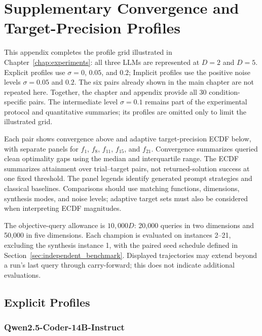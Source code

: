 \chapter{Supplementary Convergence and Target-Precision Profiles}
\label{app:benchmark_profiles}

This appendix completes the profile grid illustrated in
Chapter~\ref{chap:experiments}: all three LLMs are represented at
$D=2$ and $D=5$. Explicit profiles use $\sigma=0$, $0.05$, and $0.2$;
Implicit profiles use the positive noise levels $\sigma=0.05$ and $0.2$.
The six pairs already shown in the main chapter are not repeated here.
Together, the chapter and appendix provide all 30 condition-specific
pairs. The intermediate level $\sigma=0.1$ remains part of the
experimental protocol and quantitative summaries; its profiles are
omitted only to limit the illustrated grid.

Each pair shows convergence above and adaptive target-precision ECDF
below, with separate panels for $f_1$, $f_8$, $f_{11}$, $f_{15}$, and
$f_{21}$. Convergence summarizes queried clean optimality gaps using
the median and interquartile range. The ECDF summarizes attainment
over trial--target pairs, not returned-solution success at one fixed
threshold. The panel legends identify generated prompt strategies and
classical baselines. Comparisons should use matching functions,
dimensions, synthesis modes, and noise levels; adaptive target sets
must also be considered when interpreting ECDF magnitudes.

The objective-query allowance is $10{,}000D$: 20,000 queries in two
dimensions and 50,000 in five dimensions. Each champion is evaluated on
instances 2--21, excluding the synthesis instance 1, with the paired seed
schedule defined in Section~\ref{sec:independent_benchmark}. Displayed trajectories may
extend beyond a run's last query through carry-forward; this does not
indicate additional evaluations.

\section{Explicit Profiles}
\nopagebreak[4]

\subsection{Qwen2.5-Coder-14B-Instruct}
\nopagebreak[4]

